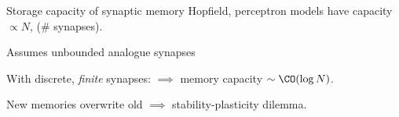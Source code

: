 \documentclass[final]{beamer}%
\begin{document}

\begin{frame}{Storage capacity of synaptic memory}
%
  Hopfield, perceptron models have capacity \alert{$\propto N$}, (\# synapses).

\vp%
  Assumes unbounded analogue synapses

 \vp With discrete, \emph{finite} synapses:
 $\implies$ memory capacity  \alert{$\sim\CO(\log N)$}.
 \\ 

 \vp New memories overwrite old
 $\implies$ stability-plasticity dilemma.
%
\end{frame}
\end{document}
